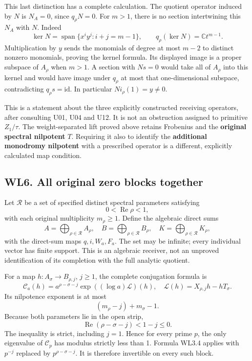 This last distinction has a complete calculation. The quotient operator
induced by \(N\) is \(N_A=0\), since \(q_\rho N=0\). For \(m>1\), there
is no section intertwining this \(N_A\) with \(N\). Indeed \[
 \ker N=\operatorname{span}\{x^iy^j:i+j=m-1\},
 \qquad
 q_\rho(\ker N)=\mathbb C t^{m-1}.
\tag{WL5.6}
\] Multiplication by \(y\) sends the monomials of degree at most \(m-2\)
to distinct nonzero monomials, proving the kernel formula. Its displayed
image is a proper subspace of \(A_\rho\) when \(m>1\). A section with
\(Ns=0\) would take all of \(A_\rho\) into this kernel and would have
image under \(q_\rho\) at most that one-dimensional subspace,
contradicting \(q_\rho s=\mathrm{id}\). In particular
\(Ni_\rho(1)=y\ne0\).

This is a statement about the three explicitly constructed receiving
operators, after consulting U01, U04 and U12. It is not an obstruction
assigned to primitive \(Z_1/\tau\). The weight-separated lift proved
above retains Frobenius and the \textbf{original spectral nilpotent}
\(T\). Requiring it also to identify the \textbf{additional monodromy
nilpotent} with a prescribed operator is a different, explicitly
calculated map condition.

\subsection{WL6. All original zero blocks
together}\label{wl6.-all-original-zero-blocks-together}

Let \(\mathcal R\) be a set of specified distinct spectral parameters
satisfying \[
 0<\operatorname{Re}\rho<1,
\] with each original multiplicity \(m_\rho\geq1\). Define the algebraic
direct sums \[
 A=\bigoplus_{\rho\in\mathcal R}A_\rho,\quad
 B=\bigoplus_{\rho\in\mathcal R}B_\rho,\quad
 K=\bigoplus_{\rho\in\mathcal R}K_\rho,
\tag{WL6.1}
\] with the direct-sum maps \(q,i,W_a,F_a\). The set may be infinite;
every individual vector has finite support. This is an algebraic
receiver, not an unproved identification of its completion with the full
analytic quotient.

For a map \(h:A_\sigma\to B_{\rho,j}\), \(j\geq1\), the complete
conjugation formula is \[
 \mathscr C_a(h)
 =a^{\rho-\sigma-j}
 \exp((\log a)\mathscr L)(h),
 \quad
 \mathscr L(h)=X_{\rho,j}h-hT_\sigma.
\tag{WL6.2}
\] Its nilpotence exponent is at most \[
 (m_\rho-j)+m_\sigma-1.
\tag{WL6.3}
\] Because both parameters lie in the open strip, \[
 \operatorname{Re}(\rho-\sigma-j)
 <1-j\leq0.
\tag{WL6.4}
\] The inequality is strict, including \(j=1\). Hence for every prime
\(p\), the only eigenvalue of \(\mathscr C_p\) has modulus strictly less
than 1. Formula WL3.4 applies with \(p^{-j}\) replaced by
\(p^{\rho-\sigma-j}\). It is therefore invertible on every such block.

